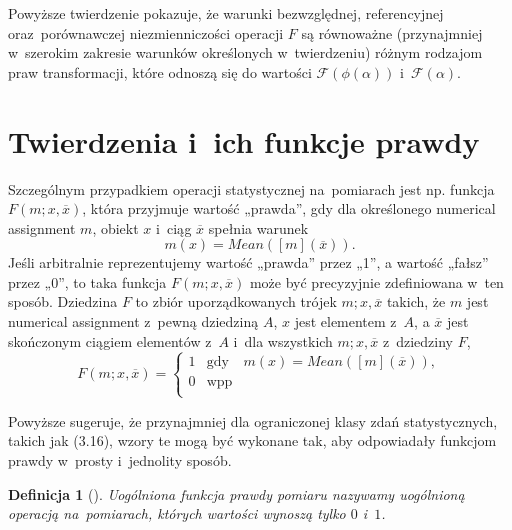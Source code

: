 \documentclass[12pt,a4paper]{report}
\newtheorem{definition}{Definicja}[chapter]
\newcommand{\domkniecie}[1]{\left[ {#1} \right] }
\begin{document}
Powyższe twierdzenie pokazuje, że warunki bezwzględnej, referencyjnej oraz~porównawczej niezmienniczości operacji $F$ są równoważne (przynajmniej w~szerokim zakresie warunków określonych w~twierdzeniu) różnym rodzajom praw transformacji, które odnoszą się do wartości $\mathcal{F}(\phi(\alpha))$ i~$\mathcal{F}(\alpha)$. 
\section{Twierdzenia i~ich funkcje prawdy}


Szczególnym przypadkiem operacji statystycznej na~pomiarach jest np. funkcja $F(m; x, \overline{x})$, która przyjmuje wartość „prawda”, gdy dla określonego numerical assignment $m$, obiekt $x$ i~ciąg $\overline{x}$ spełnia warunek
\begin{equation}
m(x)=Mean(\domkniecie{m}(\overline{x})).
\end{equation}
Jeśli arbitralnie reprezentujemy wartość „prawda” przez „1”, a wartość „fałsz” przez „0”, to taka funkcja $F(m; x, \overline{x})$ może być precyzyjnie zdefiniowana w~ten sposób. Dziedzina $F$ to zbiór uporządkowanych trójek $m; x, \overline{x}$ takich, że $m$ jest numerical assignment z~pewną dziedziną $A$, $x$ jest elementem z~$A$, a $\overline{x}$ jest skończonym ciągiem elementów z~$A$ i~dla wszystkich $m; x, \overline{x}$ z~dziedziny $F$,
\begin{equation}
F(m;x,\overline{x})= \left\{ \begin{array}{lcl}
1 & \textrm{gdy} & m(x)=Mean(\domkniecie{m}(\overline{x})),\\
0 & \textrm{wpp}\\
\end{array} \right.
\end{equation}

Powyższe sugeruje, że przynajmniej dla ograniczonej klasy zdań statystycznych, takich jak (3.16), wzory te mogą być wykonane tak, aby odpowiadały funkcjom prawdy w~prosty i~jednolity sposób.
\begin{definition}[{\citep[Def. 6]{adams1965theory}}]
Uogólniona funkcja prawdy pomiaru nazywamy uogólnioną operacją na~pomiarach, których wartości wynoszą tylko $0$ i~$1$.
\end{definition}
\end{document}
